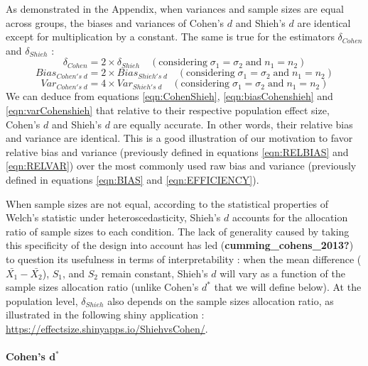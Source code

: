 \documentclass[
  english,
  man]{apa6}
\let\oldparagraph\paragraph
\renewcommand{\paragraph}[1]{\oldparagraph{#1}\mbox{}}
\begin{document}
As demonstrated in the Appendix, when variances and sample sizes are equal across groups, the biases and variances of Cohen's \(d\) and Shieh's \(d\) are identical except for multiplication by a constant. The same is true for the estimators \(\delta_{Cohen}\) and \(\delta_{Shieh}\) :\\
\begin{equation} 
\delta_{Cohen} = 2 \times \delta_{Shieh} \quad (\mbox{considering} \; \sigma_1 = \sigma_2 \; \mbox{and} \; n_1 = n_2)
\label{eqn:CohenShieh}
\end{equation}
\begin{equation} 
Bias_{Cohen's \; d} = 2 \times Bias_{Shieh's \; d} \quad (\mbox{considering} \; \sigma_1 = \sigma_2 \; \mbox{and} \; n_1 = n_2)
\label{eqn:biasCohenshieh}
\end{equation}
\begin{equation} 
Var_{Cohen's \; d} = 4 \times Var_{Shieh's \; d} \quad (\mbox{considering}\; \sigma_1 = \sigma_2 \; \mbox{and} \; n_1 = n_2)
\label{eqn:varCohenshieh}
\end{equation}
We can deduce from equations \ref{eqn:CohenShieh}, \ref{eqn:biasCohenshieh} and \ref{eqn:varCohenshieh} that relative to their respective population effect size, Cohen's \(d\) and Shieh's \(d\) are equally accurate. In other words, their relative bias and variance are identical. This is a good illustration of our motivation to favor relative bias and variance (previously defined in equations \ref{eqn:RELBIAS} and \ref{eqn:RELVAR}) over the most commonly used raw bias and variance (previously defined in equations \ref{eqn:BIAS} and \ref{eqn:EFFICIENCY}).

When sample sizes are not equal, according to the statistical properties of Welch's statistic under heteroscedasticity, Shieh's \(d\) accounts for the allocation ratio of sample sizes to each condition. The lack of generality caused by taking this specificity of the design into account has led (\textbf{cumming\_cohens\_2013?}) to question its usefulness in terms of interpretability : when the mean difference (\(\bar{X_1}-\bar{X_2}\)), \(S_1\), and \(S_2\) remain constant, Shieh's \(d\) will vary as a function of the sample sizes allocation ratio (unlike Cohen's \(d^*\) that we will define below). At the population level, \(\delta_{Shieh}\) also depends on the sample sizes allocation ratio, as illustrated in the following shiny application : \url{https://effectsize.shinyapps.io/ShiehvsCohen/}.

\hypertarget{cohens-bmd}{%
\paragraph{\texorpdfstring{Cohen's \(\bm{d^*}\)}{Cohen's \textbackslash bm\{d\^{}*\}}}\label{cohens-bmd}}
\end{document}
